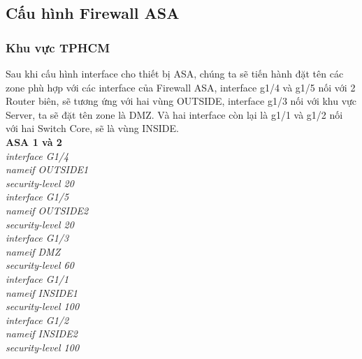 \documentclass[12pt,a4paper]{report}
\begin{document}
\subsection{Cấu hình Firewall ASA}
\subsubsection{Khu vực TPHCM}
\hspace*{1cm}Sau khi cấu hình interface cho thiết bị ASA, chúng ta sẽ tiến hành đặt tên các zone phù hợp với các interface của Firewall ASA, interface g1/4 và g1/5 nối với 2 Router biên, sẽ tương ứng với hai vùng OUTSIDE, interface g1/3 nối với khu vực Server, ta sẽ đặt tên zone là DMZ. Và hai interface còn lại là g1/1 và g1/2 nối với hai Switch Core, sẽ là vùng INSIDE.\\
\hspace*{1cm}\textbf{ASA 1 và 2}\\
\hspace*{2cm}\textit{interface G1/4\\
\hspace*{2cm}nameif  OUTSIDE1\\
\hspace*{2cm}security-level 20\\
\hspace*{2cm}interface G1/5\\
\hspace*{2cm}nameif OUTSIDE2\\
\hspace*{2cm}security-level 20\\
\hspace*{2cm}interface G1/3 \\
\hspace*{2cm}nameif DMZ \\
\hspace*{2cm}security-level 60\\
\hspace*{2cm}interface G1/1 \\
\hspace*{2cm}nameif INSIDE1\\
\hspace*{2cm}security-level 100 \\
\hspace*{2cm}interface G1/2 \\
\hspace*{2cm}nameif INSIDE2\\
\hspace*{2cm}security-level 100\\}
\end{document}
